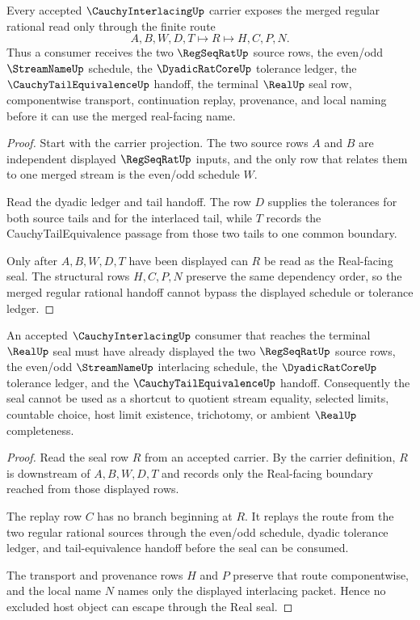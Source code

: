 \begin{theorem}
\label{thm:cauchy-interlacing-regseqrat-handoff}
Every accepted $\CauchyInterlacingUp$ carrier exposes the merged regular rational read only through the finite route
$$
A,B,W,D,T \longmapsto R \longmapsto H,C,P,N .
$$
Thus a consumer receives the two $\RegSeqRatUp$ source rows, the even/odd $\StreamNameUp$ schedule, the $\DyadicRatCoreUp$ tolerance ledger, the $\CauchyTailEquivalenceUp$ handoff, the terminal $\RealUp$ seal row, componentwise transport, continuation replay, provenance, and local naming before it can use the merged real-facing name.
\end{theorem}

\begin{proof}
Start with the carrier projection. The two source rows $A$ and $B$ are independent displayed $\RegSeqRatUp$ inputs, and the only row that relates them to one merged stream is the even/odd schedule $W$.

Read the dyadic ledger and tail handoff. The row $D$ supplies the tolerances for both source tails and for the interlaced tail, while $T$ records the CauchyTailEquivalence passage from those two tails to one common boundary.

Only after $A,B,W,D,T$ have been displayed can $R$ be read as the Real-facing seal. The structural rows $H,C,P,N$ preserve the same dependency order, so the merged regular rational handoff cannot bypass the displayed schedule or tolerance ledger.
\end{proof}

\begin{theorem}
\label{thm:cauchy-interlacing-real-seal-nonescape}
An accepted $\CauchyInterlacingUp$ consumer that reaches the terminal $\RealUp$ seal must have already displayed the two $\RegSeqRatUp$ source rows, the even/odd $\StreamNameUp$ interlacing schedule, the $\DyadicRatCoreUp$ tolerance ledger, and the $\CauchyTailEquivalenceUp$ handoff. Consequently the seal cannot be used as a shortcut to quotient stream equality, selected limits, countable choice, host limit existence, trichotomy, or ambient $\RealUp$ completeness.
\end{theorem}

\begin{proof}
Read the seal row $R$ from an accepted carrier. By the carrier definition, $R$ is downstream of $A,B,W,D,T$ and records only the Real-facing boundary reached from those displayed rows.

The replay row $C$ has no branch beginning at $R$. It replays the route from the two regular rational sources through the even/odd schedule, dyadic tolerance ledger, and tail-equivalence handoff before the seal can be consumed.

The transport and provenance rows $H$ and $P$ preserve that route componentwise, and the local name $N$ names only the displayed interlacing packet. Hence no excluded host object can escape through the Real seal.
\end{proof}

